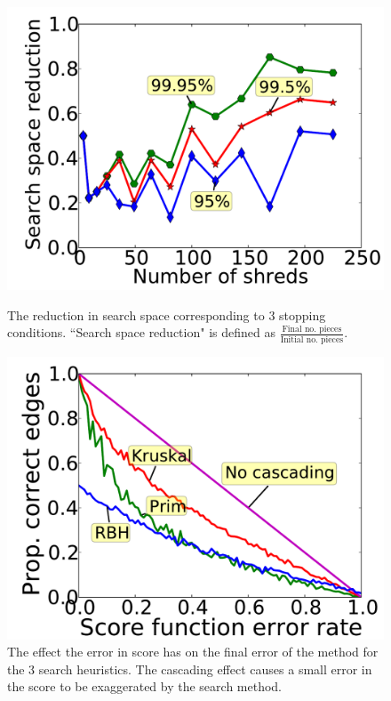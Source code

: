 \documentclass{llncs}
\begin{document}
\begin{figure}[t]
    \centering
    \begin{minipage}[b]{0.48\textwidth}
        \centering
        \includegraphics[width=\textwidth]{searchRed.pdf}
        \caption{The reduction in search space corresponding to 3 stopping conditions. ``Search space reduction" is defined as $\frac{\mbox{Final no. pieces}}{\mbox{Initial no. pieces}}$.}
        \label{fig:searchReduct}
    \end{minipage}
    \hfill
    \begin{minipage}[b]{0.48\textwidth}
        \centering
        \includegraphics[width=\textwidth]{cascadingComp.pdf}
        \caption{The effect the error in score has on the final error of the method for the 3 search heuristics. The cascading effect causes a small error in the score to be exaggerated by the search method.}
        \label{fig:cascading}
    \end{minipage}
\end{figure}
\end{document}
